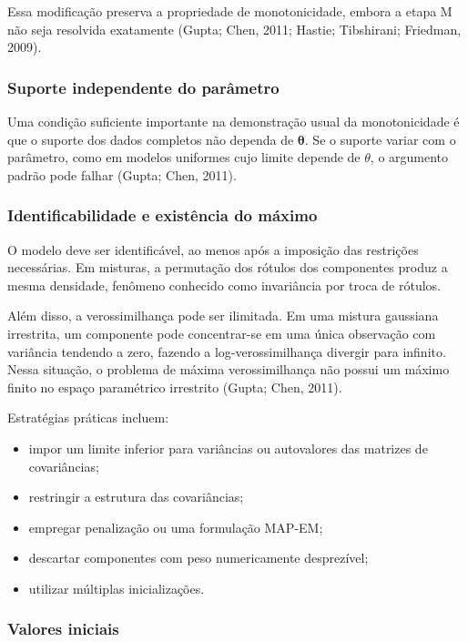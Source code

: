 \documentclass[
  letterpaper,
  DIV=11,
  numbers=noendperiod]{scrreprt}
\providecommand{\tightlist}{%
  \setlength{\itemsep}{0pt}\setlength{\parskip}{0pt}}\usepackage{longtable,booktabs,array}
\begin{document}
Essa modificação preserva a propriedade de monotonicidade, embora a
etapa M não seja resolvida exatamente (Gupta; Chen, 2011; Hastie;
Tibshirani; Friedman, 2009).

\subsubsection{Suporte independente do
parâmetro}\label{suporte-independente-do-paruxe2metro}

Uma condição suficiente importante na demonstração usual da
monotonicidade é que o suporte dos dados completos não dependa de
\(\boldsymbol{\theta}\). Se o suporte variar com o parâmetro, como em
modelos uniformes cujo limite depende de \(\theta\), o argumento padrão
pode falhar (Gupta; Chen, 2011).

\subsubsection{Identificabilidade e existência do
máximo}\label{identificabilidade-e-existuxeancia-do-muxe1ximo}

O modelo deve ser identificável, ao menos após a imposição das
restrições necessárias. Em misturas, a permutação dos rótulos dos
componentes produz a mesma densidade, fenômeno conhecido como
invariância por troca de rótulos.

Além disso, a verossimilhança pode ser ilimitada. Em uma mistura
gaussiana irrestrita, um componente pode concentrar-se em uma única
observação com variância tendendo a zero, fazendo a log-verossimilhança
divergir para infinito. Nessa situação, o problema de máxima
verossimilhança não possui um máximo finito no espaço paramétrico
irrestrito (Gupta; Chen, 2011).

Estratégias práticas incluem:

\begin{itemize}
\tightlist
\item
  impor um limite inferior para variâncias ou autovalores das matrizes
  de covariâncias;
\item
  restringir a estrutura das covariâncias;
\item
  empregar penalização ou uma formulação MAP-EM;
\item
  descartar componentes com peso numericamente desprezível;
\item
  utilizar múltiplas inicializações.
\end{itemize}

\subsubsection{Valores iniciais}\label{valores-iniciais}
\end{document}

